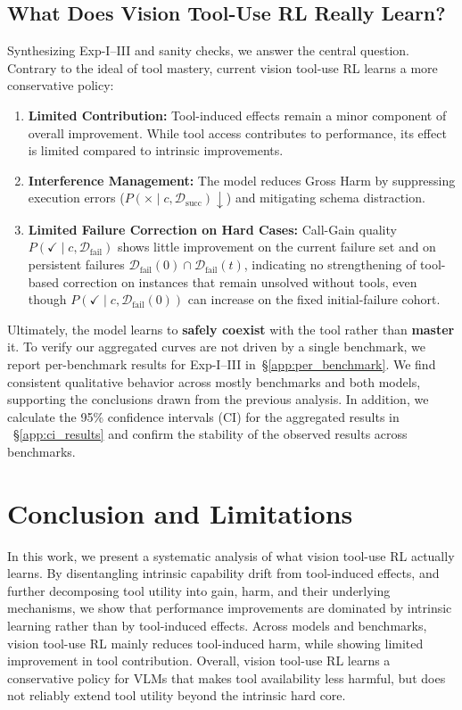 \subsection{What Does Vision Tool-Use RL Really Learn?}
%
Synthesizing Exp-I–III and sanity checks, we answer the central question.
%
Contrary to the ideal of tool mastery, current vision tool-use RL learns a more conservative policy:
%
\begin{enumerate}
    \item \textbf{Limited Contribution:} Tool-induced effects remain a minor component of overall improvement. While tool access contributes to performance, its effect is limited compared to intrinsic improvements.
    \item \textbf{Interference Management:} The model reduces Gross Harm by suppressing execution errors ($P(\times \mid c, \mathcal{D}_{\text{succ}}) \downarrow$) and mitigating schema distraction.
    \item \textbf{Limited Failure Correction on Hard Cases:}
Call-Gain quality $P(\checkmark \mid c,\mathcal D_{\mathrm{fail}})$ shows little improvement on the current failure set and on persistent failures
$\mathcal D_{\mathrm{fail}}(0)\cap \mathcal D_{\mathrm{fail}}(t)$, indicating no strengthening of tool-based correction on instances that remain unsolved without tools, even though $P(\checkmark \mid c,\mathcal D_{\mathrm{fail}}(0))$ can increase on the fixed initial-failure cohort.
%
\end{enumerate}
%
Ultimately, the model learns to \textbf{safely coexist} with the tool rather than \textbf{master} it.
%
To verify our aggregated curves are not driven by a single benchmark, we report per-benchmark results for Exp-I--III in~\S\ref{app:per_benchmark}.
We find consistent qualitative behavior across mostly benchmarks and both models, supporting the conclusions drawn from the previous analysis.
%
In addition, we calculate the 95\% confidence intervals (CI) for the aggregated results in ~\S\ref{app:ci_results} and confirm the stability of the observed results across benchmarks.





\vspace{-5px}
%
\section{Conclusion and Limitations}

In this work, we present a systematic analysis of what vision tool-use RL actually learns.
%
By disentangling intrinsic capability drift from tool-induced effects, and further decomposing tool utility into gain, harm, and their underlying mechanisms, we show that performance improvements are dominated by intrinsic learning rather than by tool-induced effects.
%
Across models and benchmarks, vision tool-use RL mainly reduces tool-induced harm, while showing limited improvement in tool contribution.
%
Overall, vision tool-use RL learns a conservative policy for VLMs that makes tool availability less harmful, but does not reliably extend tool utility beyond the intrinsic hard core.

